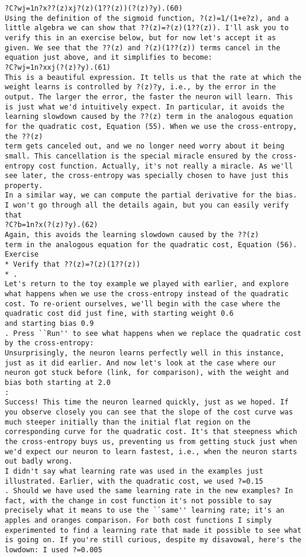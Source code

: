 \begin{lstlisting}
?C?wj=1n?x??(z)xj?(z)(1??(z))(?(z)?y).(60)
Using the definition of the sigmoid function, ?(z)=1/(1+e?z), and a little algebra we can show that ??(z)=?(z)(1??(z)). I'll ask you to verify this in an exercise below, but for now let's accept it as given. We see that the ??(z) and ?(z)(1??(z)) terms cancel in the equation just above, and it simplifies to become: 
?C?wj=1n?xxj(?(z)?y).(61)
This is a beautiful expression. It tells us that the rate at which the weight learns is controlled by ?(z)?y, i.e., by the error in the output. The larger the error, the faster the neuron will learn. This is just what we'd intuitively expect. In particular, it avoids the learning slowdown caused by the ??(z) term in the analogous equation for the quadratic cost, Equation (55). When we use the cross-entropy, the ??(z)
term gets canceled out, and we no longer need worry about it being small. This cancellation is the special miracle ensured by the cross-entropy cost function. Actually, it's not really a miracle. As we'll see later, the cross-entropy was specially chosen to have just this property.
In a similar way, we can compute the partial derivative for the bias. I won't go through all the details again, but you can easily verify that 
?C?b=1n?x(?(z)?y).(62)
Again, this avoids the learning slowdown caused by the ??(z)
term in the analogous equation for the quadratic cost, Equation (56).
Exercise
* Verify that ??(z)=?(z)(1??(z))
* .
Let's return to the toy example we played with earlier, and explore what happens when we use the cross-entropy instead of the quadratic cost. To re-orient ourselves, we'll begin with the case where the quadratic cost did just fine, with starting weight 0.6
and starting bias 0.9
. Press ``Run'' to see what happens when we replace the quadratic cost by the cross-entropy:
Unsurprisingly, the neuron learns perfectly well in this instance, just as it did earlier. And now let's look at the case where our neuron got stuck before (link, for comparison), with the weight and bias both starting at 2.0
:
Success! This time the neuron learned quickly, just as we hoped. If you observe closely you can see that the slope of the cost curve was much steeper initially than the initial flat region on the corresponding curve for the quadratic cost. It's that steepness which the cross-entropy buys us, preventing us from getting stuck just when we'd expect our neuron to learn fastest, i.e., when the neuron starts out badly wrong.
I didn't say what learning rate was used in the examples just illustrated. Earlier, with the quadratic cost, we used ?=0.15
. Should we have used the same learning rate in the new examples? In fact, with the change in cost function it's not possible to say precisely what it means to use the ``same'' learning rate; it's an apples and oranges comparison. For both cost functions I simply experimented to find a learning rate that made it possible to see what is going on. If you're still curious, despite my disavowal, here's the lowdown: I used ?=0.005

\end{lstlisting}
